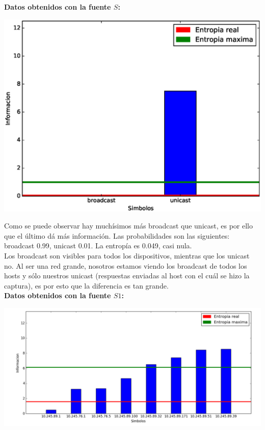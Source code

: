 \textbf{Datos obtenidos con la fuente $S$:}

\begin{center}
\includegraphics[scale=0.6]{imagenes/analisisTCORPcableada/fuenteS.eps} 
\end{center}

Como se puede observar hay muchísimos más broadcast que unicast, es por ello que el último dá más información. Las probabilidades son las siguientes: broadcast 0.99, unicast 0.01. La entropía es 0.049, casi nula.\\

Los broadcast son visibles para todos los dispositivos, mientras que los unicast no. Al ser una red grande, nosotros estamos viendo los broadcast de todos los hosts y sólo nuestros unicast (respuestas enviadas al host con el cuál se hizo la captura), es por esto que la diferencia es tan grande.\\

\textbf{Datos obtenidos con la fuente $S1$:}

\begin{center}
\includegraphics[scale=0.45]{imagenes/analisisTCORPcableada/fuenteS1.png} 
\end{center}




